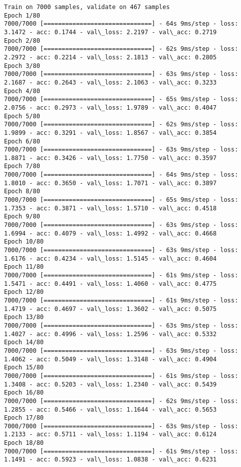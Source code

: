 \documentclass[11pt]{article}
\begin{document}
    \begin{Verbatim}[commandchars=\\\{\}]
Train on 7000 samples, validate on 467 samples
Epoch 1/80
7000/7000 [==============================] - 64s 9ms/step - loss: 3.1472 - acc: 0.1744 - val\_loss: 2.2197 - val\_acc: 0.2719
Epoch 2/80
7000/7000 [==============================] - 62s 9ms/step - loss: 2.2972 - acc: 0.2214 - val\_loss: 2.1813 - val\_acc: 0.2805
Epoch 3/80
7000/7000 [==============================] - 63s 9ms/step - loss: 2.1687 - acc: 0.2643 - val\_loss: 2.1063 - val\_acc: 0.3233
Epoch 4/80
7000/7000 [==============================] - 65s 9ms/step - loss: 2.0756 - acc: 0.2973 - val\_loss: 1.9789 - val\_acc: 0.4047
Epoch 5/80
7000/7000 [==============================] - 62s 9ms/step - loss: 1.9899 - acc: 0.3291 - val\_loss: 1.8567 - val\_acc: 0.3854
Epoch 6/80
7000/7000 [==============================] - 63s 9ms/step - loss: 1.8871 - acc: 0.3426 - val\_loss: 1.7750 - val\_acc: 0.3597
Epoch 7/80
7000/7000 [==============================] - 64s 9ms/step - loss: 1.8010 - acc: 0.3650 - val\_loss: 1.7071 - val\_acc: 0.3897
Epoch 8/80
7000/7000 [==============================] - 65s 9ms/step - loss: 1.7353 - acc: 0.3871 - val\_loss: 1.5710 - val\_acc: 0.4518
Epoch 9/80
7000/7000 [==============================] - 63s 9ms/step - loss: 1.6994 - acc: 0.4079 - val\_loss: 1.4992 - val\_acc: 0.4668
Epoch 10/80
7000/7000 [==============================] - 63s 9ms/step - loss: 1.6176 - acc: 0.4234 - val\_loss: 1.5145 - val\_acc: 0.4604
Epoch 11/80
7000/7000 [==============================] - 61s 9ms/step - loss: 1.5471 - acc: 0.4491 - val\_loss: 1.4060 - val\_acc: 0.4775
Epoch 12/80
7000/7000 [==============================] - 61s 9ms/step - loss: 1.4719 - acc: 0.4697 - val\_loss: 1.3602 - val\_acc: 0.5075
Epoch 13/80
7000/7000 [==============================] - 63s 9ms/step - loss: 1.4027 - acc: 0.4996 - val\_loss: 1.2596 - val\_acc: 0.5332
Epoch 14/80
7000/7000 [==============================] - 63s 9ms/step - loss: 1.4062 - acc: 0.5049 - val\_loss: 1.3148 - val\_acc: 0.4904
Epoch 15/80
7000/7000 [==============================] - 61s 9ms/step - loss: 1.3408 - acc: 0.5203 - val\_loss: 1.2340 - val\_acc: 0.5439
Epoch 16/80
7000/7000 [==============================] - 62s 9ms/step - loss: 1.2855 - acc: 0.5466 - val\_loss: 1.1644 - val\_acc: 0.5653
Epoch 17/80
7000/7000 [==============================] - 63s 9ms/step - loss: 1.2133 - acc: 0.5711 - val\_loss: 1.1194 - val\_acc: 0.6124
Epoch 18/80
7000/7000 [==============================] - 61s 9ms/step - loss: 1.1491 - acc: 0.5923 - val\_loss: 1.0838 - val\_acc: 0.6231

\end{Verbatim}
\end{document}

